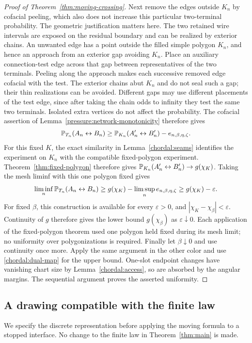 \begin{proof}[Proof of Theorem~\ref{thm:moving-crossing}]
Next remove the edges outside $K_n$ by cofacial peeling, which also
does not increase this particular two-terminal probability.  The geometric
justification matters here.  The two retained wire intervals are
exposed on the residual boundary and can be realized by exterior
chains.  An unwanted edge has a point outside the filled simple
polygon $K_n$, and hence an approach from an exterior gap avoiding
$K_n$.  Place an auxiliary connection-test edge across that gap
between representatives of the two terminals.  Peeling along the
approach makes each successive removed edge cofacial with the test.
The exterior chains abut $K_n$ and do not seal such a gap; their
thin realizations can be avoided.  Different gaps may use different
placements of the test edge, since after taking the chain odds to
infinity they test the same two terminals.  Isolated extra vertices
do not affect the probability.  The cofacial assertion of
Lemma~\ref{pressure:network-monotonicity} therefore gives
\[
 \mathbb P_{T_n}(A_n\leftrightarrow B_n)
 \ge \mathbb P_{K_n}(A'_n\leftrightarrow B'_n)
       -e_{n,\beta,\eta,\zeta}.
\]
For this fixed $K$, the exact similarity in
Lemma~\ref{chordal:seams} identifies the experiment on $K_n$ with
the compatible fixed-polygon experiment.  Theorem~\ref{thm:fixed-polygon}
therefore gives
$\mathbb P_{K_n}(A'_n\leftrightarrow B'_n)\to g(\chi_K)$.
Taking the mesh liminf with this one polygon fixed gives
\[
 \liminf_n\mathbb P_{T_n}(A_n\leftrightarrow B_n)
 \ge g(\chi_K)-\limsup_n e_{n,\beta,\eta,\zeta}
 \ge g(\chi_K)-\varepsilon.
\]
For fixed $\beta$, this construction is available for every
$\varepsilon>0$, and $|\chi_K-\chi_\beta|<\varepsilon$.
Continuity of $g$ therefore gives the lower bound
$g(\chi_\beta)$ as $\varepsilon\downarrow0$.  Each application
of the fixed-polygon theorem used one polygon held fixed during its
mesh limit; no uniformity over polygonizations is required.
Finally let $\beta\downarrow0$ and use continuity once more.
Apply the same argument in the other
color and use \eqref{chordal:dual-map} for the upper bound.
One-slot endpoint changes have vanishing chart size by
Lemma~\ref{chordal:access}, so are absorbed by the angular margins.
The sequential argument proves the asserted uniformity.
\end{proof}

\subsection{A drawing compatible with the finite law}

We specify the discrete representation before applying the moving
formula to a stopped interface.  No change to the finite law in
Theorem~\ref{thm:main} is made.

